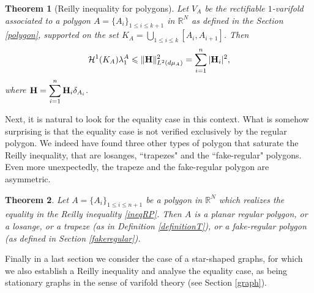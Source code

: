 \documentclass[12pt,english]{smfart} %
\newtheorem{theorem}{Theorem}[section]
\theoremstyle{remark}
\newcommand{\R}{\mathbb{R}}
\newcommand{\Hm}{{\bf H}}
\begin{document}
\medskip
\medskip\begin{theorem}[Reilly inequality for polygons]\label{ReillyPolygon} Let  $V_A$ be the rectifiable $1$-varifold associated to a polygon $A=\{A_i\}_{1\leqslant i \leqslant k+1}$ in $\R^N$ as defined in the Section \ref{polygon}, supported on the set $K_A=\bigcup_{1\leqslant i\leqslant k}[A_i,A_{i+1}]$.  Then
 \begin{eqnarray}
 \mathcal{H}^1(K_A) \lambda_1^A \leqslant \|{\bf H} \|^2_{L^2(d \mu_A)}=\displaystyle\sum_{i=1}^{n} |\Hm_i|^2, \label{ineqRP}
\end{eqnarray} 
where $\Hm=\displaystyle\sum_{i=1}^{n}\Hm_i\delta_{A_i}$.
\end{theorem} 


Next, it is natural to look for the equality case in this context. What is somehow surprising  is that the equality case is not verified exclusively by the regular polygon. We indeed have found three other types of polygon that saturate the Reilly inequality, that are losanges,  ``trapezes" and the ``fake-regular" polygons. Even more unexpectedly, the trapeze and the fake-regular polygon are asymmetric.
 

\medskip\begin{theorem}\label{Equality-Case} Let $A=\{A_i\}_{1\leqslant i \leqslant n+1}$ be a polygon in $\R^N$ which realizes the equality in the Reilly inequality \eqref{ineqRP}. Then $A$ is a planar regular polygon, or a losange, or a trapeze (as in Definition \ref{definitionT}), or a fake-regular polygon (as defined in Section \ref{fakeregular}).
\end{theorem}



Finally in a last section we consider the case of a star-shaped graphs, for which we also establish a Reilly inequality and analyse the equality case, as being stationary graphs in the sense of varifold theory (see Section \ref{graph}). 
\end{document}
